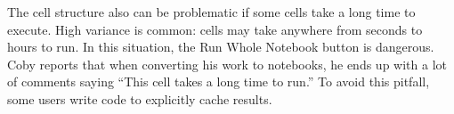 The cell structure also can be problematic if some cells take a long time to
execute. High variance is common: cells may take anywhere from seconds to
hours to run. In this situation, the Run Whole Notebook button is dangerous.
Coby reports that when converting his work to notebooks, he
ends up with a lot of comments saying ``This cell takes a long time to run.''
To avoid this pitfall, some users write code to explicitly cache results.








